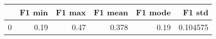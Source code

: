 \begin{tabular}{lrrrrr}
\toprule
{} &  F1 min &  F1 max &  F1 mean &  F1 mode &    F1 std \\
\midrule
0 &    0.19 &    0.47 &    0.378 &     0.19 &  0.104575 \\
\bottomrule
\end{tabular}
